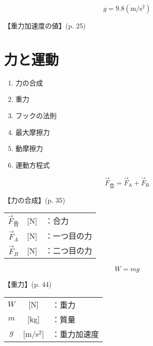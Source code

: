 \documentclass[10pt]{jarticle}
\begin{document}
\newpage
\[
	g = 9.8  \mathrm{(m/s^2)}
\]


\vskip3mm
【重力加速度の値】{\footnotesize (p. 25)}







\newpage
\addtocounter{page}{-1}
\thispagestyle{empty}
\section{力と運動}

\begin{enumerate}
\setcounter{enumi}{\thepage}
\small
\itemsep-4mm
\item 力の合成\\
\item 重力\\
\item フックの法則\\
\item 最大摩擦力\\
\item 動摩擦力\\
\item 運動方程式
\end{enumerate}



\newpage
\[
	\vec{F}_{合} = \vec{F}_\mathrm{A} + \vec{F}_\mathrm{B}
\]


\vskip3mm
【力の合成】{\footnotesize (p. 35)}

\begin{tabular}{ccl}
$\vec{F}_{合}$	&[N]	&：合力\\
$\vec{F}_{A}$	&[N]	&：一つ目の力\\
$\vec{F}_{B}$	&[N]	&：二つ目の力
\end{tabular}





\newpage
\[
	W = mg
\]


\vskip3mm
【重力】{\footnotesize (p. 44)}

\begin{tabular}{ccl}
$W$	&[N]	&：重力\\
$m$	&[kg]	&：質量\\
$g$	&[m/s$^2$]	&：重力加速度
\end{tabular}
\end{document}
